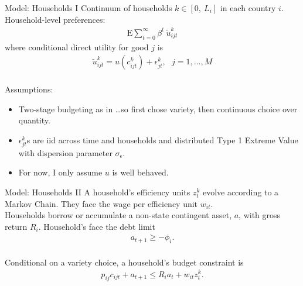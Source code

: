 \documentclass[9pt,pdftex,aspectratio=1610]{beamer}
\theoremstyle{definition}
\begin{document}

\begin{frame}[t]{Model: Households I}
\smallskip
Continuum of households $k \in [0, \ L_i]$ in each country $i$.\\
\medskip
Household-level preferences:
\begin{align*}
\mathrm{E}\sum_{t = 0}^{\infty} \beta^{t} \ \tilde{u}^k_{ijt}
\end{align*}
where conditional direct utility for good $j$ is
\begin{align*}
\tilde{u}^k_{ijt} =  u(c^k_{ijt}) + \epsilon^k_{jt}, \ \ \ j = 1, \ldots, M
\end{align*}\\
\medskip
Assumptions:
\begin{itemize}
\item Two-stage budgeting as in \citet*{anderson1987ces}\ldots so first chose variety, then continuous choice over quantity. 
\smallskip
\item $\epsilon^k_{jt}$s are iid across time and households and distributed Type 1 Extreme Value with dispersion parameter $\sigma_{\epsilon}$.
\smallskip
\item For now, I only assume $u$ is well behaved.
\end{itemize}
\end{frame}


\begin{frame}[t]{Model: Households II}
\smallskip
A household's efficiency units $z^k_t$ evolve according to a Markov Chain. They face the wage per efficiency unit $w_{it}$.\\
\bigskip
\medskip
Households borrow or accumulate a non-state contingent asset, $a$, with gross return $R_{i}$. Household's face the debt limit
\begin{align*}
a_{t+1} \geq - \phi_{i}.
\end{align*}\\
\bigskip
\medskip
Conditional on a variety choice, a household's budget constraint is
\begin{align*}
p_{ij}c_{ijt} +  a_{t+1} \leq    R_{i} a_{t} + w_{it} z^k_{t}.
\end{align*}
\end{frame}
\end{document}
